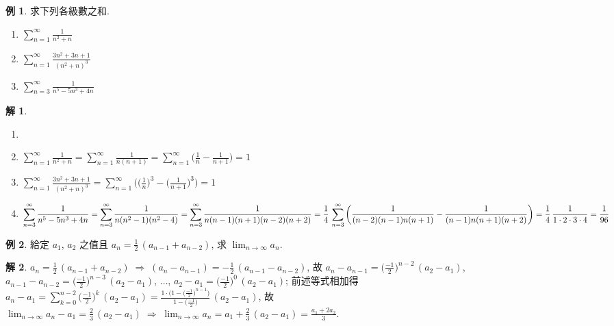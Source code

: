 \documentclass[12pt]{extarticle}
\newcommand{\ds}{\displaystyle}
\newcommand{\ie}{\;\Longrightarrow\;}
\theoremstyle{definition}
\newtheorem*{ex}{例}
\newtheorem*{sol}{解}
\begin{document}
\begin{ex} 求下列各級數之和. 
  \begin{multicols}{3}
    \begin{enumerate}\setlength{\itemsep}{0pt}
      \item $\ds\sum_{n = 1}^\infty\frac{1}{n^2 + n}$
      \item $\ds\sum_{n = 1}^\infty\frac{3n^2 + 3n + 1}{(n^2 + n)^3}$
      \item $\ds\sum_{n = 3}^\infty\frac{1}{n^5 - 5n^3 + 4n}$
    \end{enumerate}
  \end{multicols}
\end{ex}

\begin{sol}
  \begin{enumerate}\setlength{\itemsep}{0pt}
    \item[]
    \item $\ds\sum_{n = 1}^\infty\frac{1}{n^2 + n} = \sum_{n = 1}^\infty\frac{1}{n(n + 1)} = \sum_{n = 1}^\infty\Big(\frac{1}{n} - \frac{1}{n + 1}\Big) = 1$
    \item $\ds\sum_{n = 1}^\infty\frac{3n^2 + 3n + 1}{(n^2 + n)^3} = \sum_{n = 1}^\infty\bigg(\Big(\frac{1}{n}\Big)^3 - \Big(\frac{1}{n + 1}\Big)^3\bigg) = 1$
    \item $\ds\sum_{n = 3}^\infty\frac{1}{n^5 - 5n^3 + 4n} = \sum_{n = 3}^\infty\frac{1}{n(n^2 - 1)(n^2 - 4)} = \sum_{n = 3}^\infty\frac{1}{n(n - 1)(n + 1)(n - 2)(n + 2)} \\= \frac{1}{4}\,\sum_{n = 3}^\infty\bigg(\frac{1}{(n - 2)(n - 1)n(n + 1)} - \frac{1}{(n - 1)n(n + 1)(n + 2)}\bigg) = \frac{1}{4}\,\frac{1}{1\cdot2\cdot3\cdot4} = \frac{1}{96}$
  \end{enumerate}
\end{sol}

\begin{ex}
  給定 $a_1$, $a_2$ 之值且 $\ds a_n = \frac{1}{2}\,(a_{n - 1} + a_{n - 2})$, 求 $\ds\lim_{n\to\infty}a_n$. 
\end{ex}

\begin{sol}
  $\ds a_n = \frac{1}{2}\,(a_{n - 1} + a_{n - 2}) \ie (a_n - a_{n - 1}) = -\frac{1}{2}\,(a_{n - 1} - a_{n - 2})$, 故 $\ds a_n - a_{n - 1} = \Big(\frac{-1}{2}\Big)^{n - 2}\,(a_2 - a_1)$, $\ds a_{n - 1} - a_{n - 2} = \Big(\frac{-1}{2}\Big)^{n - 3}\,(a_2 - a_1)$, $\ldots$, $\ds a_2 - a_1 = \Big(\frac{-1}{2}\Big)^0\,(a_2 - a_1)$; 前述等式相加得 $\ds a_n - a_1 = \sum_{k = 0}^{n - 2}\Big(\frac{-1}{2}\Big)^k\,(a_2 - a_1) = \frac{1\cdot\big(1 - \big(\frac{-1}{2}\big)^{n - 1}\big)}{1 - \big(\frac{-1}{2}\big)}\,(a_2 - a_1)$, 故 $\ds \lim_{n\to\infty} a_n - a_1 = \frac{2}{3}\,(a_2 - a_1) \ie \lim_{n\to\infty} a_n = a_1 + \frac{2}{3}\,(a_2 - a_1) = \frac{a_1 + 2 a_2}{3}$.  
\end{sol}
\end{document}
